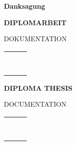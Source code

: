 \bigskip
{}


\newpage
\thispagestyle{empty}
\mbox{}
\newpage

\begin{center}
\begin{huge}
\textbf{Danksagung}
\end{huge}
\end{center}

\vspace{2cm}


\newpage
\thispagestyle{empty}
\mbox{}
\newpage


\centering
\begin{huge}
\textbf{DIPLOMARBEIT}
\end{huge}

\begin{large}
DOKUMENTATION
\end{large}

\begin{tabular}{|l|l|l|}
\hline
 &  &  \\ \hline
 &  &  \\ \hline
 &  &  \\ \hline
 &  &  \\ \hline
 &  &  \\ \hline
 &  &  \\ \hline
 &  &  \\ \hline
 &  &  \\ \hline
 &  &  \\ \hline
\end{tabular}


\newpage
\centering
\begin{huge}
\textbf{DIPLOMA THESIS}
\end{huge}

\begin{large}
DOCUMENTATION
\end{large}

\begin{tabular}{|l|l|l|}
\hline
 &  &  \\ \hline
 &  &  \\ \hline
 &  &  \\ \hline
 &  &  \\ \hline
 &  &  \\ \hline
 &  &  \\ \hline
 &  &  \\ \hline
 &  &  \\ \hline
 &  &  \\ \hline
\end{tabular}

